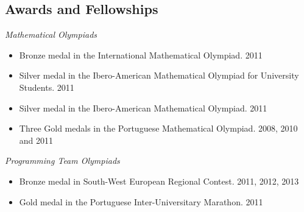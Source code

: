 \documentclass[margin, 10pt]{res} %
\begin{document}
\begin{resume}
\section{Awards and Fellowships}

{\sl Mathematical Olympiads}
\begin{itemize} \itemsep -2pt %
\item Bronze medal in the International Mathematical Olympiad. {\tiny 2011}
\item Silver medal in the Ibero-American Mathematical Olympiad for
University Students. {\tiny 2011}
\item Silver medal in the Ibero-American Mathematical Olympiad. {\tiny 2011}
\item Three Gold medals in the Portuguese Mathematical Olympiad. {\tiny 2008, 2010 and 2011}
\end{itemize}


\vspace{-0.2cm}

{\sl Programming Team Olympiads}
\begin{itemize} 
\item Bronze medal in South-West European Regional Contest. {\tiny 2011, 2012, 2013}
\item Gold medal in the Portuguese Inter-Universitary Marathon. {\tiny 2011}
\end{itemize} 
\vspace{-0.2cm}



\end{resume}
\end{document}
